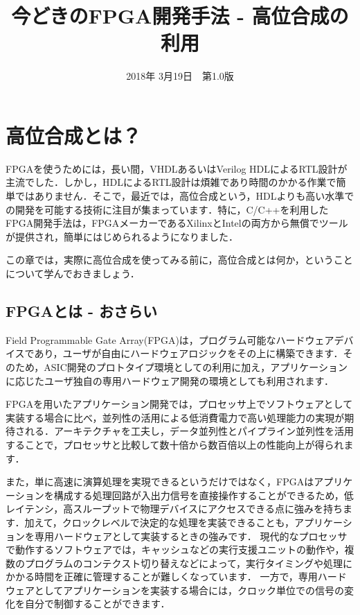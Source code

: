 \documentclass[a4paper,dvipdfmx]{jsarticle}
\begin{document}
\title{今どきのFPGA開発手法 - 高位合成の利用}
\author{}
\date{2018年 3月19日~~第1.0版}
\maketitle

\section{高位合成とは？}\label{sec:overview}

FPGAを使うためには，長い間，VHDLあるいはVerilog HDLによるRTL設計が主流でした．しかし，HDLによるRTL設計は煩雑であり時間のかかる作業で簡単ではありません．そこで，最近では，高位合成という，HDLよりも高い水準での開発を可能する技術に注目が集まっています．特に，C/C++を利用したFPGA開発手法は，FPGAメーカーであるXilinxとIntelの両方から無償でツールが提供され，簡単にはじめられるようになりました．

この章では，実際に高位合成を使ってみる前に，高位合成とは何か，ということについて学んでおきましょう．

\subsection{FPGAとは - おさらい}
Field Programmable Gate Array(FPGA)は，プログラム可能なハードウェアデバイスであり，ユーザが自由にハードウェアロジックをその上に構築できます．そのため，ASIC開発のプロトタイプ環境としての利用に加え，アプリケーションに応じたユーザ独自の専用ハードウェア開発の環境としても利用されます．

FPGAを用いたアプリケーション開発では，プロセッサ上でソフトウェアとして実装する場合に比べ，並列性の活用による低消費電力で高い処理能力の実現が期待される．アーキテクチャを工夫し，データ並列性とパイプライン並列性を活用することで，プロセッサと比較して数十倍から数百倍以上の性能向上が得られます．

また，単に高速に演算処理を実現できるというだけではなく，FPGAはアプリケーションを構成する処理回路が入出力信号を直接操作することができるため，低レイテンシ，高スループットで物理デバイスにアクセスできる点に強みを持ちます．加えて，クロックレベルで決定的な処理を実装できることも，アプリケーションを専用ハードウェアとして実装するときの強みです．
現代的なプロセッサで動作するソフトウェアでは，キャッシュなどの実行支援ユニットの動作や，複数のプログラムのコンテクスト切り替えなどによって，実行タイミングや処理にかかる時間を正確に管理することが難しくなっています．
一方で，専用ハードウェアとしてアプリケーションを実装する場合には，クロック単位での信号の変化を自分で制御することができます．
\end{document}
